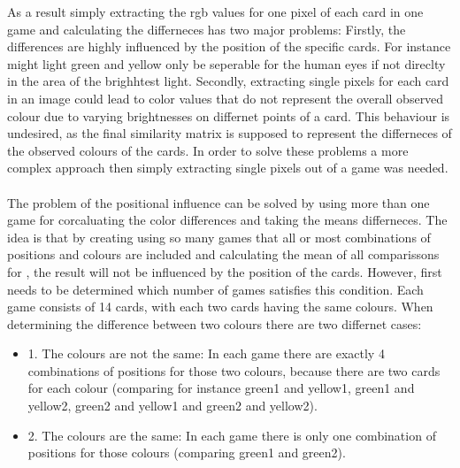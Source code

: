 As a result simply extracting the rgb values for one pixel of each card in one game and calculating the differneces has two major problems: Firstly, the differences are highly influenced by the position of the specific cards. For instance might light green and yellow only be seperable for the human eyes if not direclty in the area of the brighhtest light. Secondly, extracting single pixels for each card in an image could lead to color values that do not represent the overall observed colour due to varying brightnesses on differnet points of a card. This behaviour is undesired, as the final similarity matrix is supposed to represent the differneces of the observed colours of the cards.  In order to solve these problems a more complex approach then simply extracting single pixels out of a game was needed. \\\\
The problem of the positional influence can be solved by using more than one game for corcaluating the color differences and taking the means differneces.  The idea is that by creating using so many games that all or most combinations of positions and colours are included and calculating the mean of all comparissons for , the result will not be influenced by the position of the cards. However, first needs to be determined which number of games satisfies this condition. Each game consists of 14 cards, with each two cards having the same colours. When determining the difference between two colours there are two differnet cases: 
\begin{itemize}
	\item 1. The colours are not the same: In each game there are exactly 4 combinations of positions for those two colours, because there are two cards for each colour (comparing for instance green1 and yellow1, green1 and yellow2, green2 and yellow1 and green2 and yellow2). 
	\item 2. The colours are the same: In each game there is only one combination of positions for those colours (comparing green1 and green2).  
\end{itemize}

